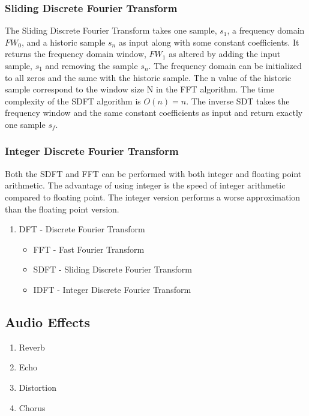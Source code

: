 \subsubsection{Sliding Discrete Fourier Transform}
The Sliding Discrete Fourier Transform takes one sample, $s_1$, a
frequency domain $FW_0$, and a historic sample $s_n$ as input along with some
constant coefficients.
It returns the frequency domain window, $FW_1$ as altered by adding the input
sample, $s_1$ and removing the sample $s_n$. The frequency domain can be
initialized to all zeros and the same with the historic sample. The n value of
the historic sample correspond to the window size N in the FFT algorithm. The
time complexity of the SDFT algorithm is $O(n) = n$. The inverse SDT takes the
frequency window and the same constant coefficients as input and return exactly
one sample $s_f$.

\subsubsection{Integer Discrete Fourier Transform}
Both the SDFT and FFT can be performed with both
integer and floating point arithmetic. The advantage
of using integer is the speed of integer arithmetic compared to floating point.
The integer version performs a worse approximation than the floating point
version. 

\begin{enumerate}
\item DFT - Discrete Fourier Transform
	\begin{itemize}
	  \item FFT - Fast Fourier Transform
		\item SDFT - Sliding Discrete Fourier Transform
		\item IDFT - Integer Discrete Fourier Transform
	\end{itemize}
\end{enumerate}

\subsection{Audio Effects}

\begin{enumerate}
	\item Reverb
	\item Echo
	\item Distortion
	\item Chorus
\end{enumerate}

